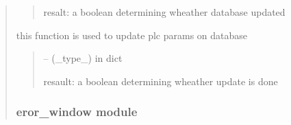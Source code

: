 \documentclass[letterpaper,10pt,english]{sphinxmanual}
\begin{document}
\begin{quote}
\begin{savenotes}
\begin{fulllineitems}
\begin{savenotes}
\begin{fulllineitems}
\begin{quote}
\begin{description}
\sphinxAtStartPar
resalt: a boolean determining wheather database updated

\end{description}\end{quote}

\end{fulllineitems}\end{savenotes}


\begin{savenotes}\begin{fulllineitems}
\label{\detokenize{setting/database_utils:oxin.database_utils.dataBaseUtils.update_plc_parms}}
\pysigstartsignatures
{}
\pysigstopsignatures
\sphinxAtStartPar
this function is used to update plc params on database
\begin{quote}\begin{description}
\sphinxAtStartPar
{} – (\_type\_) in dict

\sphinxAtStartPar
resault: a boolean determining wheather update is done

\end{description}\end{quote}

\end{fulllineitems}\end{savenotes}


\end{fulllineitems}\end{savenotes}


\sphinxstepscope


\subsubsection{eror\_window module}
\label{\detokenize{setting/eror_window:module-oxin.eror_window}}\label{\detokenize{setting/eror_window:eror-window-module}}\label{\detokenize{setting/eror_window::doc}}


\end{quote}
\end{document}
